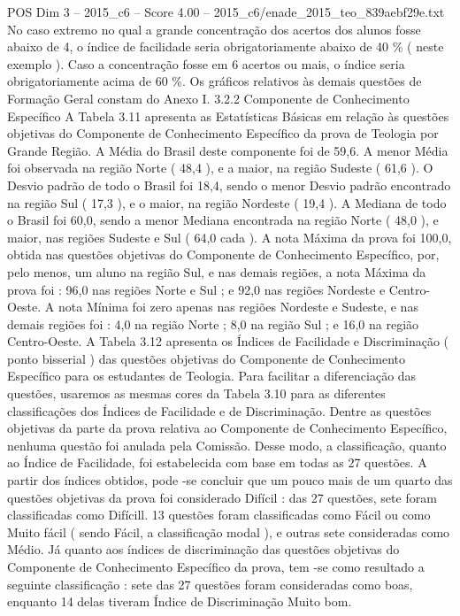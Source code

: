 \begin{textsample}{POS Dim 3 – 2015\_c6 – Score 4.00 – 2015\_c6/enade\_2015\_teo\_839aebf29e.txt}
No caso extremo no qual a grande concentração dos acertos dos alunos fosse abaixo de 4, o índice de facilidade seria obrigatoriamente abaixo de 40 \% ( neste exemplo ).
Caso a concentração fosse em 6 acertos ou mais, o índice seria obrigatoriamente acima de 60 \%.
Os gráficos relativos às demais questões de Formação Geral constam do Anexo I. 3.2.2 Componente de Conhecimento Específico A Tabela 3.11 apresenta as Estatísticas Básicas em relação às questões objetivas do Componente de Conhecimento Específico da prova de Teologia por Grande Região.
A Média do Brasil deste componente foi de 59,6.
A menor Média foi observada na região Norte ( 48,4 ), e a maior, na região Sudeste ( 61,6 ).
O Desvio padrão de todo o Brasil foi 18,4, sendo o menor Desvio padrão encontrado na região Sul ( 17,3 ), e o maior, na região Nordeste ( 19,4 ).
A Mediana de todo o Brasil foi 60,0, sendo a menor Mediana encontrada na região Norte ( 48,0 ), e maior, nas regiões Sudeste e Sul ( 64,0 cada ).
A nota Máxima da prova foi 100,0, obtida nas questões objetivas do Componente de Conhecimento Específico, por, pelo menos, um aluno na região Sul, e nas demais regiões, a nota Máxima da prova foi : 96,0 nas regiões Norte e Sul ; e 92,0 nas regiões Nordeste e Centro-Oeste.
A nota Mínima foi zero apenas nas regiões Nordeste e Sudeste, e nas demais regiões foi : 4,0 na região Norte ; 8,0 na região Sul ; e 16,0 na região Centro-Oeste.
A Tabela 3.12 apresenta os Índices de Facilidade e Discriminação ( ponto bisserial ) das questões objetivas do Componente de Conhecimento Específico para os estudantes de Teologia.
Para facilitar a diferenciação das questões, usaremos as mesmas cores da Tabela 3.10 para as diferentes classificações dos Índices de Facilidade e de Discriminação.
Dentre as questões objetivas da parte da prova relativa ao Componente de Conhecimento Específico, nenhuma questão foi anulada pela Comissão.
Desse modo, a classificação, quanto ao Índice de Facilidade, foi estabelecida com base em todas as 27 questões.
A partir dos índices obtidos, pode -se concluir que um pouco mais de um quarto das questões objetivas da prova foi considerado Difícil : das 27 questões, sete foram classificadas como Difícill. 13 questões foram classificadas como Fácil ou como Muito fácil ( sendo Fácil, a classificação modal ), e outras sete consideradas como Médio.
Já quanto aos índices de discriminação das questões objetivas do Componente de Conhecimento Específico da prova, tem -se como resultado a seguinte classificação : sete das 27 questões foram consideradas como boas, enquanto 14 delas tiveram Índice de Discriminação Muito bom.

\end{textsample}

